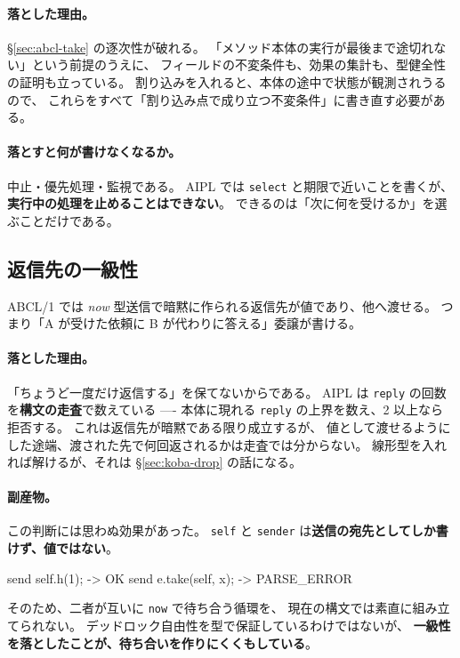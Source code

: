 \documentclass[11pt,a4paper]{ltjsarticle}
\theoremstyle{definition}
\theoremstyle{remark}
\begin{document}
\paragraph{落とした理由。}
\S\ref{sec:abcl-take} の逐次性が破れる。
「メソッド本体の実行が最後まで途切れない」という前提のうえに、
フィールドの不変条件も、効果の集計も、型健全性の証明も立っている。
割り込みを入れると、本体の途中で状態が観測されうるので、
これらをすべて「割り込み点で成り立つ不変条件」に書き直す必要がある。

\paragraph{落とすと何が書けなくなるか。}
中止・優先処理・監視である。
AIPL では \texttt{select} と期限で近いことを書くが、
\textbf{実行中の処理を止めることはできない}。
できるのは「次に何を受けるか」を選ぶことだけである。

\subsection{返信先の一級性}

ABCL/1 では \emph{now} 型送信で暗黙に作られる返信先が値であり、他へ渡せる。
つまり「A が受けた依頼に B が代わりに答える」委譲が書ける。

\paragraph{落とした理由。}
「ちょうど一度だけ返信する」を保てないからである。
AIPL は \texttt{reply} の回数を\textbf{構文の走査}で数えている ----
本体に現れる \texttt{reply} の上界を数え、2 以上なら拒否する。
これは返信先が暗黙である限り成立するが、
値として渡せるようにした途端、渡された先で何回返されるかは走査では分からない。
線形型を入れれば解けるが、それは \S\ref{sec:koba-drop} の話になる。

\paragraph{副産物。}
この判断には思わぬ効果があった。
\texttt{self} と \texttt{sender} は\textbf{送信の宛先としてしか書けず、値ではない}。

\begin{term}
send self.h(1);          -> OK
send e.take(self, x);    -> PARSE_ERROR
\end{term}

そのため、二者が互いに \texttt{now} で待ち合う循環を、
現在の構文では素直に組み立てられない。
デッドロック自由性を型で保証しているわけではないが、
\textbf{一級性を落としたことが、待ち合いを作りにくくもしている}。
\end{document}
